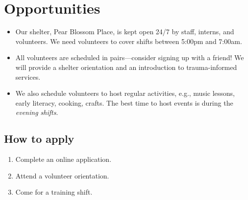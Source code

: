\documentclass[14pt]{extarticle}
\begin{document}
\begin{minipage}{0.7\textwidth}
\section*{Opportunities}
\begin{itemize}
\item Our shelter, Pear Blossom Place, is kept open 24/7 by staff, interns, and volunteers. We need volunteers to cover shifts between 5:00pm and 7:00am. 

\item All volunteers are scheduled in pairs---consider signing up with a friend! We will provide a shelter orientation and an introduction to trauma-informed  services. 

\item We also schedule volunteers to host regular activities, e.g., music lessons, early literacy, cooking, crafts. The best time to host events is during the \emph{evening shifts}.
\end{itemize}

\subsection*{How to apply}
\begin{enumerate}[itemsep=0pt]
	\item Complete an online application.
    \item Attend a volunteer orientation. 
    \item Come for a training shift.
\end{enumerate}
\end{minipage}
\end{document}
